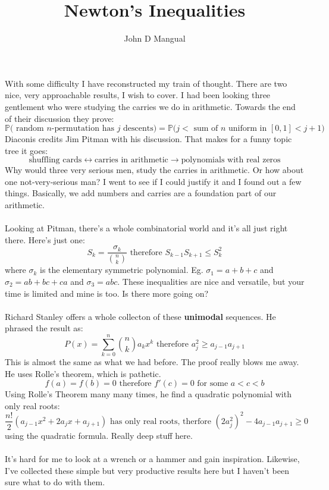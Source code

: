 \documentclass[12pt]{article}
\title{Newton's Inequalities}
\author{John D Mangual}
\date{}
\begin{document}
\selectfont \fontsize{12.5}{15}\selectfont

\maketitle

\noindent With some difficulty I have reconstructed my train of thought.  There are two nice, very approachable results, I wish to cover.  I had been looking three gentlement who were studying the carries we do in arithmetic.  Towards the end of their discussion they prove:
$$ \mathbb{P}\big( \text{ random } n\text{-permutation has }j\text{ descents}\big)
 = \mathbb{P} \big( j < \text{ sum of }n\text{ uniform in }[0,1] < j+1 \big) $$
Diaconis credits Jim Pitman with his discussion.  That makes for a funny topic tree it goes:
$$ \text{shuffling cards}\leftrightarrow\text{carries in arithmetic}\to \text{polynomials with real zeros}$$
Why would three very serious men, study the carries in arithmetic.  Or how about one not-very-serious man? I went to see if I could justify it and I found out a few things.  Basically, we add numbers and carries are a foundation part of our arithmetic. \\ \\
Looking at Pitman, there's a whole combinatorial world and it's all just right there.  Here's just one:
$$ S_k = \frac{\sigma_k}{\binom{n}{k}} \text{ therefore }S_{k-1}S_{k+1} \leq S_k^2 $$
where $\sigma_k$ is the elementary symmetric polynomial.  Eg. $\sigma_1 = a+b+c$ and  $\sigma_2 = ab + bc + ca$ and $\sigma_3 = abc$. These inequalities are nice and versatile, but your time is limited and mine is too.  Is there more going on? \\ \\
Richard Stanley offers a whole collecton of these \textbf{unimodal} sequences.  He phrased the result as:
$$ P(x) = \sum_{k=0}^n \binom{n}{k} a_k x^k \text{ therefore } a_j^2 \geq a_{j-1}a_{j+1}$$
This is almost the same as what we had before.  The proof really blows me away.  He uses Rolle's theorem, which is pathetic. 
$$ f(a) = f(b) = 0 \text{ therefore } f'(c) = 0 \text{ for some } a < c < b $$
Using Rolle's Theorem many many times, he find a quadratic polynomial with only real roots:
$$ \frac{n!}{2} ( a_{j-1}x^2 + 2a_j x + a_{j+1}) \text{ has only real roots, therfore }(2a_j^2)^2 - 4 a_{j-1}a_{j+1} \geq 0 $$
using the quadratic formula.  Really deep stuff here. \\ \\
It's hard for me to look at a wrench or a hammer and gain inspiration.  Likewise, I've collected these simple but very productive results here but I haven't been sure what to do with them.
\end{document}
